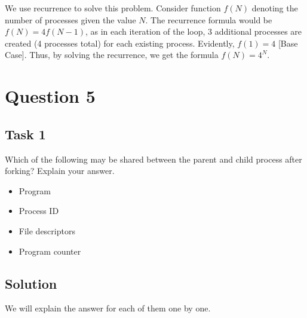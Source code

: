 \documentclass[../main.tex]{subfiles}
\begin{document}
We use recurrence to solve this problem. Consider function $f(N)$ denoting the number of processes given the value $N$. The recurrence formula would be $f(N) = 4f(N-1)$, as in each iteration of the loop, 3 additional processes are created (4 processes total) for each existing process. Evidently, $f(1) = 4$ [Base Case]. Thus, by solving the recurrence, we get the formula $f(N)=4^N$.

\newpage
\section{Question 5}

\subsection{Task 1}

Which of the following may be shared between the parent and child process after forking? Explain your answer.

\begin{itemize}
    \item Program
    \item Process ID
    \item File descriptors
    \item Program counter
\end{itemize}

\subsection*{Solution}

We will explain the answer for each of them one by one.
\end{document}
